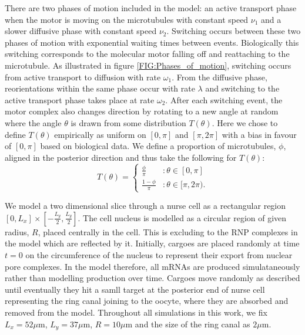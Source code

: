 \documentclass[twocolumn]{biophys}
\begin{document}
There are two phases of motion included in the model: an active transport phase when the motor is moving on the microtubules with constant speed $\nu_1$ and a slower diffusive phase with constant speed $\nu_2$.
Switching occurs between these two phases of motion with exponential waiting times between events.
Biologically this switching corresponds to the molecular motor falling off and reattaching to the microtubule.
As illustrated in figure \ref{FIG:Phases_of_motion}, switching occurs from active transport to diffusion with rate $\omega_1$. 
From the diffusive phase, reorientations within the same phase occur with rate $\lambda$ and switching to the active transport phase takes place at rate $\omega_2$. 
After each switching event, the motor complex also changes direction by rotating to a new angle at random where the angle $\theta $ is drawn from some distribution $T(\theta)$. 
Here we chose to define $T(\theta)$ empirically as uniform on $[0,\pi ]$ and $[\pi, 2\pi ]$ with a bias in favour of $[0,\pi ]$ based on biological data.
We define a proportion of microtubules, $\phi$, aligned in the posterior direction and thus take the following for $T(\theta)$:
\begin{equation*}         
T(\theta) = \begin{cases} \frac{\phi}{\pi} & : \theta \in [0,\pi] \\ \frac{1-\phi}{\pi} & : \theta \in [\pi,2\pi).                       
\end{cases}
\end{equation*}

We model a two dimensional slice through a nurse cell as a rectangular region $[0,L_x] \times [-\frac{L_y}{2},\frac{L_y}{2}]$.
The cell nucleus is modelled as a circular region of given radius, $R$, placed centrally in the cell. 
This is excluding to the RNP complexes in the model which are reflected by it.
Initially, cargoes are placed randomly at time $t=0$ on the circumference of the nucleus to represent their export from nuclear pore complexes.
In the model therefore, all mRNAs are produced simulataneously rather than modelling production over time.
Cargoes move randomly as described until eventually they hit a samll target at the posterior end of nurse cell representing the ring canal joining to the oocyte, where they are absorbed and removed from the model.
Throughout all simulations in this work, we fix $L_x=52 \mu \text{m}$, $L_y=37 \mu \text{m}$, $R=10 \mu \text{m}$ and the size of the ring canal as $2\mu \text{m}$.
\end{document}
